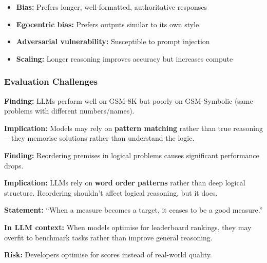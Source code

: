 \begin{tipbox}
\begin{itemize}
  \item \textbf{Bias:} Prefers longer, well-formatted, authoritative responses
  \item \textbf{Egocentric bias:} Prefers outputs similar to its own style
  \item \textbf{Adversarial vulnerability:} Susceptible to prompt injection
  \item \textbf{Scaling:} Longer reasoning improves accuracy but increases compute
\end{itemize}
\end{tipbox}

\bigseparator

\subsubsection{Evaluation Challenges}

\begin{defbox}
\textbf{Finding:} LLMs perform well on GSM-8K but poorly on GSM-Symbolic (same problems with different numbers/names).

\textbf{Implication:} Models may rely on \textbf{pattern matching} rather than true reasoning---they memorise solutions rather than understand the logic.
\end{defbox}

\begin{defbox}
\textbf{Finding:} Reordering premises in logical problems causes significant performance drops.

\textbf{Implication:} LLMs rely on \textbf{word order patterns} rather than deep logical structure. Reordering shouldn't affect logical reasoning, but it does.
\end{defbox}

\begin{defbox}
\textbf{Statement:} ``When a measure becomes a target, it ceases to be a good measure.''

\textbf{In LLM context:} When models optimise for leaderboard rankings, they may overfit to benchmark tasks rather than improve general reasoning.

\textbf{Risk:} Developers optimise for scores instead of real-world quality.
\end{defbox}

